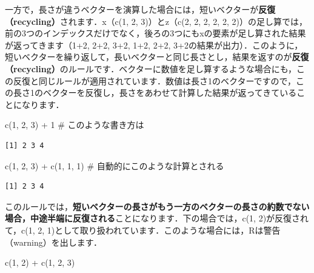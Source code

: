 \documentclass[
  letterpaper,
  DIV=11,
  numbers=noendperiod]{scrreprt}
\newenvironment{Shaded}{\begin{snugshade}}{\end{snugshade}}
\newcommand{\CommentTok}[1]{\textcolor[rgb]{0.37,0.37,0.37}{#1}}
\newcommand{\DecValTok}[1]{\textcolor[rgb]{0.68,0.00,0.00}{#1}}
\newcommand{\FunctionTok}[1]{\textcolor[rgb]{0.28,0.35,0.67}{#1}}
\newcommand{\NormalTok}[1]{\textcolor[rgb]{0.00,0.23,0.31}{#1}}
\newcommand{\SpecialCharTok}[1]{\textcolor[rgb]{0.37,0.37,0.37}{#1}}
\begin{document}
一方で，長さが違うベクターを演算した場合には，短いベクターが\textbf{反復（recycling）}されます．x（c(1,
2, 3)）とz（c(2, 2, 2, 2, 2,
2)）の足し算では，前の3つのインデックスだけでなく，後ろの3つにもxの要素が足し算された結果が返ってきます（1+2,
2+2, 3+2, 1+2, 2+2,
3+2の結果が出力）．このように，短いベクターを繰り返して，長いベクターと同じ長さとし，結果を返すのが\textbf{反復（recycling）}のルールです．ベクターに数値を足し算するような場合にも，この反復と同じルールが適用されています．数値は長さ1のベクターですので，この長さ1のベクターを反復し，長さをあわせて計算した結果が返ってきていることになります．

\begin{Shaded}
\begin{Highlighting}[]
\FunctionTok{c}\NormalTok{(}\DecValTok{1}\NormalTok{, }\DecValTok{2}\NormalTok{, }\DecValTok{3}\NormalTok{) }\SpecialCharTok{+} \DecValTok{1} \CommentTok{\# このような書き方は}
\end{Highlighting}
\end{Shaded}

\begin{verbatim}
[1] 2 3 4
\end{verbatim}

\begin{Shaded}
\begin{Highlighting}[]
\FunctionTok{c}\NormalTok{(}\DecValTok{1}\NormalTok{, }\DecValTok{2}\NormalTok{, }\DecValTok{3}\NormalTok{) }\SpecialCharTok{+} \FunctionTok{c}\NormalTok{(}\DecValTok{1}\NormalTok{, }\DecValTok{1}\NormalTok{, }\DecValTok{1}\NormalTok{) }\CommentTok{\# 自動的にこのような計算とされる}
\end{Highlighting}
\end{Shaded}

\begin{verbatim}
[1] 2 3 4
\end{verbatim}

このルールでは，\textbf{短いベクターの長さがもう一方のベクターの長さの約数でない場合，中途半端に反復される}ことになります．下の場合では，c(1,
2)が反復されて，c(1, 2,
1)として取り扱われています．このような場合には，Rは警告（warning）を出します．

\begin{Shaded}
\begin{Highlighting}[]
\FunctionTok{c}\NormalTok{(}\DecValTok{1}\NormalTok{, }\DecValTok{2}\NormalTok{) }\SpecialCharTok{+} \FunctionTok{c}\NormalTok{(}\DecValTok{1}\NormalTok{, }\DecValTok{2}\NormalTok{, }\DecValTok{3}\NormalTok{)}
\end{Highlighting}
\end{Shaded}
\end{document}
